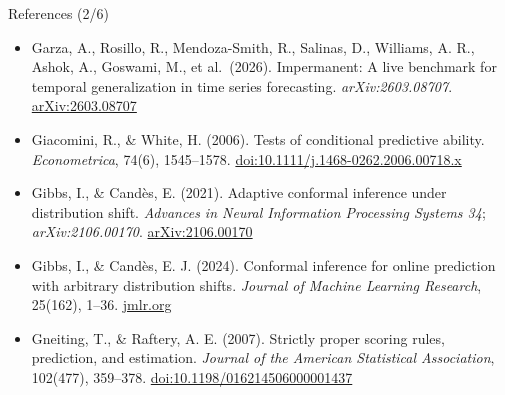 \begin{frame}{References (2/6)}
\begin{itemize}
    \item Garza, A., Rosillo, R., Mendoza-Smith, R., Salinas, D., Williams, A. R., Ashok, A., Goswami, M., et al.\ (2026). Impermanent: A live benchmark for temporal generalization in time series forecasting. \textit{arXiv:2603.08707}. \href{https://arxiv.org/abs/2603.08707}{arXiv:2603.08707}
    \item Giacomini, R., \& White, H. (2006). Tests of conditional predictive ability. \textit{Econometrica}, 74(6), 1545--1578. \href{https://doi.org/10.1111/j.1468-0262.2006.00718.x}{doi:10.1111/j.1468-0262.2006.00718.x}
    \item Gibbs, I., \& Candès, E. (2021). Adaptive conformal inference under distribution shift. \textit{Advances in Neural Information Processing Systems 34}; \textit{arXiv:2106.00170}. \href{https://arxiv.org/abs/2106.00170}{arXiv:2106.00170}
    \item Gibbs, I., \& Candès, E. J. (2024). Conformal inference for online prediction with arbitrary distribution shifts. \textit{Journal of Machine Learning Research}, 25(162), 1--36. \href{https://jmlr.org/papers/v25/22-1218.html}{jmlr.org}
    \item Gneiting, T., \& Raftery, A. E. (2007). Strictly proper scoring rules, prediction, and estimation. \textit{Journal of the American Statistical Association}, 102(477), 359--378. \href{https://doi.org/10.1198/016214506000001437}{doi:10.1198/016214506000001437}
\end{itemize}
\end{frame}

